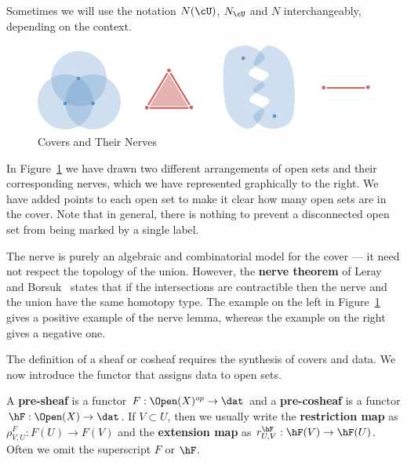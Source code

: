 \begin{rmk}
Sometimes we will use the notation $N(\cU)$, $N_{\cU}$ and $N$ interchangeably, depending on the context.
\end{rmk}


\begin{figure}[ht]
\centering
\includegraphics[width=\textwidth]{nerves.pdf}
\caption{Covers and Their Nerves}
\label{fig:nerves}
\end{figure}

In Figure~\ref{fig:nerves} we have drawn two different arrangements of open sets and their corresponding nerves, which we have represented graphically to the right. We have added points to each open set to make it clear how many open sets are in the cover. Note that in general, there is nothing to prevent a disconnected open set from being marked by a single label. 

The nerve is purely an algebraic and combinatorial model for the cover --- it need not respect the topology of the union. However, the \textbf{nerve theorem} of Leray and Borsuk~\cite{leray45,borsuk-nerve} states that if the intersections are contractible then the nerve and the union have the same homotopy type. The example on the left in Figure~\ref{fig:nerves} gives a positive example of the nerve lemma, whereas the example on the right gives a negative one.

The definition of a sheaf or cosheaf requires the synthesis of covers and data. We now introduce the functor that assigns data to open sets.
\begin{defn}
	A \textbf{pre-sheaf} is a functor $F:\Open(X)^{op}\to\dat$ and a \textbf{pre-cosheaf} is a functor $\hF:\Open(X)\to\dat$. If $V\subset U$, then we usually write the \textbf{restriction map} as $\rho_{V,U}^F:F(U)\to F(V)$ and the \textbf{extension map} as $r^{\hF}_{U,V}:\hF(V)\to\hF(U)$. Often we omit the superscript $F$ or $\hF$.
\end{defn}

